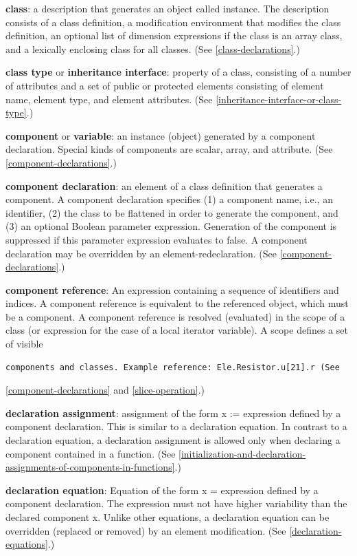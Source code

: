 \documentclass[10pt,a4paper]{report}
\begin{document}
\textbf{class}: a description that generates an object called instance.
The description consists of a class definition, a modification
environment that modifies the class definition, an optional list of
dimension expressions if the class is an array class, and a lexically
enclosing class for all classes. (See \ref{class-declarations}.)

\textbf{class type} or \textbf{inheritance interface}: property of a
class, consisting of a number of attributes and a set of public or
protected elements consisting of element name, element type, and element
attributes. (See \ref{inheritance-interface-or-class-type}.)

\textbf{component} or \textbf{variable}: an instance (object) generated
by a component declaration. Special kinds of components are scalar,
array, and attribute. (See \ref{component-declarations}.)

\textbf{component declaration}: an element of a class definition that
generates a component. A component declaration specifies (1) a component
name, i.e., an identifier, (2) the class to be flattened in order to
generate the component, and (3) an optional Boolean parameter
expression. Generation of the component is suppressed if this parameter
expression evaluates to false. A component declaration may be overridden
by an element-redeclaration. (See \ref{component-declarations}.)

\textbf{component reference}: An expression containing a sequence of
identifiers and indices. A component reference is equivalent to the
referenced object, which must be a component. A component reference is
resolved (evaluated) in the scope of a class (or expression for the case
of a local iterator variable). A scope defines a set of visible
\begin{lstlisting}[language=modelica]
  components and classes. Example reference: Ele.Resistor.u[21].r (See
\end{lstlisting}
\ref{component-declarations} and \ref{slice-operation}.)

\textbf{declaration assignment}: assignment of the form x := expression
defined by a component declaration. This is similar to a declaration
equation. In contrast to a declaration equation, a declaration
assignment is allowed only when declaring a component contained in a
function. (See \ref{initialization-and-declaration-assignments-of-components-in-functions}.)

\textbf{declaration equation}: Equation of the form x = expression
defined by a component declaration. The expression must not have higher
variability than the declared component x. Unlike other equations, a
declaration equation can be overridden (replaced or removed) by an
element modification. (See \ref{declaration-equations}.)
\end{document}

